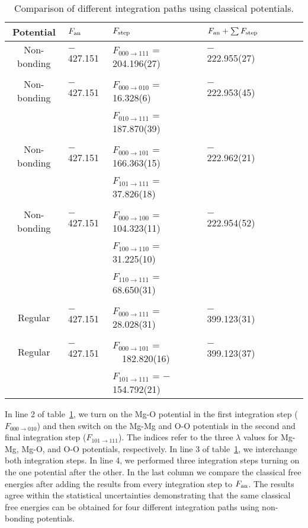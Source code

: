  \begin{table}[!h]
     \centering
\caption{Comparison of different integration paths using classical potentials. 
  \label{tab:compare_int_path}}

     \begin{tabular}{clllllll}
         \hline
{Potential} & 
            {$F_{\rm an}$} & 
            {$F_{\rm step}$} & 
            {$F_{\rm an} + \sum F_{\rm step}$} \\
         \hline
Non-bonding & $-$427.151 & $F_{000 \to 111}$ = 204.196(27)      & $-$222.955(27)
\\[1mm]\hline\\[-2.5mm]
Non-bonding & $-$427.151 & $F_{000 \to 010}$ = $\,\:$16.328(6)  & $-$222.953(45)\\
           &          & $F_{010 \to 111}$ = 187.870(39) 
\\[1mm]\hline\\[-2.5mm]
Non-bonding & $-$427.151 & $F_{000 \to 101}$ = 166.363(15)      & $-$222.962(21)\\
           &          & $F_{101 \to 111}$ = $\,\:$37.826(18)
\\[1mm]\hline\\[-2.5mm]
Non-bonding & $-$427.151 & $F_{000 \to 100}$ = 104.323(11)      & $-$222.954(52)\\
           &          & $F_{100 \to 110}$ = $\,\:$31.225(10) \\
           &          & $F_{110 \to 111}$ = $\,\:$68.650(31)
\\[1mm]\hline\\[-2.5mm]
Regular     & $-$427.151 & $F_{000 \to 111}$ = $\,\:$28.028(31) & $-$399.123(31) 
\\[1mm]\hline\\[-2.5mm]
Regular     & $-$427.151 & $F_{000 \to 101}$ = ~~182.820(16)      & $-$399.123(37) \\
           &          & $F_{101 \to 111}$ = $-$154.792(21) \\
\hline
\end{tabular}
\end{table}

In line 2 of table~\ref{tab:compare_int_path}, we turn on the Mg-O
potential in the first integration step ($F_{000 \to 010}$) and then switch
on the Mg-Mg and O-O potentials in the second and final integration step
($F_{101 \to 111}$). The indices refer to the three $\lambda$ values for
Mg-Mg, Mg-O, and O-O potentials, respectively. In line 3 of
table~\ref{tab:compare_int_path}, we interchange both integration steps. In
line 4, we performed three integration steps turning on the one potential
after the other. In the last column we compare the classical free energies
after adding the results from every integration step to $F_{\rm an}$. The
results agree within the statistical uncertainties demonstrating that the
same classical free energies can be obtained for four different integration
paths using non-bonding potentials.

